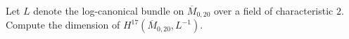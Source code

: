Let $L$ denote the log-canonical bundle on $\overline{M}_{0,20}$ over a field of characteristic $2$. Compute the dimension of $H^{17}(\overline{M}_{0,20}, L^{-1})$.
